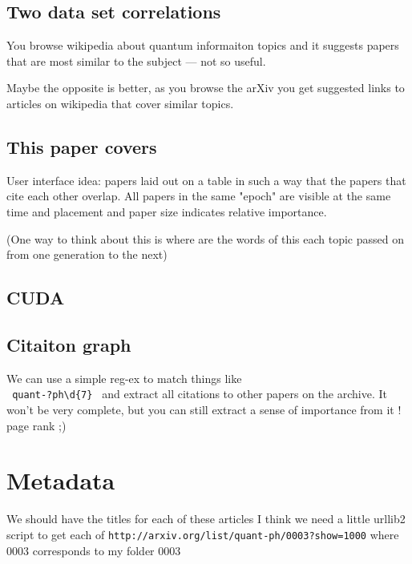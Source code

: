 \documentclass[11pt]{article}
\begin{document}
    \subsection{Two data set correlations}

        You browse wikipedia about quantum informaiton topics and it suggests
        papers that are most similar to the subject --- not so useful.

        Maybe the opposite is better, as you browse the arXiv you get suggested
        links to articles on wikipedia that cover similar topics.




	
	\subsection{This paper covers}
	
		User interface idea: papers laid out on a table in such a way that the papers that
		cite each other overlap. All papers in the same "epoch" are visible at the same time
		and placement and paper size indicates relative importance.
		
		(One way to think about this is where are the words of this each topic passed on from one generation
		to the next)
		 
		
	\subsection{CUDA }
			
    \subsection{Citaiton graph}
        We can use a simple reg-ex to match things like \\
        \verb| quant-?ph\d{7} | and extract all citations to other
        papers on the archive.
        It won't be very complete, but you can still extract a sense 
        of importance from it !
        page rank ;)

    \section{Metadata}
        We should have the titles for each of these articles I think
        we need a little urllib2 script to get each of
        \verb|http://arxiv.org/list/quant-ph/0003?show=1000|
        where 0003 corresponds to my folder 0003 




\end{document}
